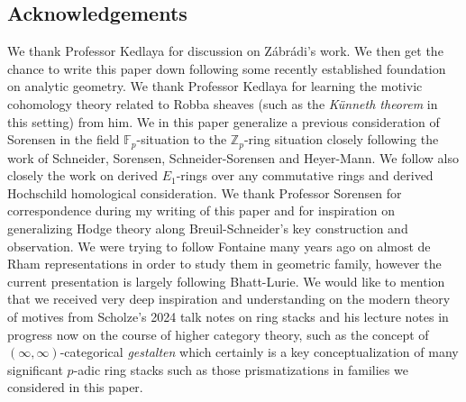 \documentclass[12pt]{article}
\theoremstyle{definition}
\begin{document}
\newpage
\subsection*{Acknowledgements}

We thank Professor Kedlaya for discussion on Z\'abr\'adi's work. We then get the chance to write this paper down following some recently established foundation on analytic geometry. We thank Professor Kedlaya for learning the motivic cohomology theory related to Robba sheaves (such as the \textit{K\"unneth theorem} in this setting) from him. We in this paper generalize a previous consideration of Sorensen in the field $\mathbb{F}_p$-situation to the $\mathbb{Z}_p$-ring situation closely following the work of Schneider, Sorensen, Schneider-Sorensen and Heyer-Mann. We follow also closely the work \cite{Sa} on derived $E_1$-rings over any commutative rings and derived Hochschild homological consideration. We thank Professor Sorensen for correspondence during my writing of this paper and for inspiration on generalizing Hodge theory along Breuil-Schneider's key construction and observation. We were trying to follow Fontaine many years ago on almost de Rham representations in order to study them in geometric family, however the current presentation is largely following Bhatt-Lurie. We would like to mention that we received very deep inspiration and understanding on the modern theory of motives from Scholze's 2024 talk notes on ring stacks and his lecture notes in progress now on the course of higher category theory, such as the concept of $(\infty,\infty)$-categorical \textit{gestalten} which certainly is a key conceptualization of many significant $p$-adic ring stacks such as those prismatizations in families we considered in this paper. 
\end{document}
